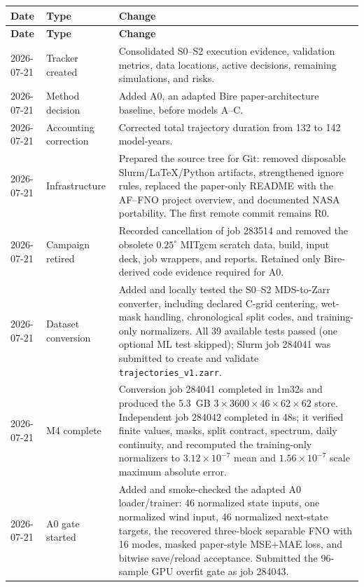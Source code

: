 \documentclass[11pt]{article}
\begin{document}
\begin{longtable}{@{}p{}p{}p{}@{}}
\toprule
\textbf{Date} & \textbf{Type} & \textbf{Change} \\
\midrule
\endfirsthead
\toprule
\textbf{Date} & \textbf{Type} & \textbf{Change} \\
\midrule
\endhead
2026-07-21 & Tracker created & Consolidated S0--S2 execution evidence, validation metrics, data locations, active decisions, remaining simulations, and risks. \\
2026-07-21 & Method decision & Added A0, an adapted Bire paper-architecture baseline, before models A--C. \\
2026-07-21 & Accounting correction & Corrected total trajectory duration from 132 to 142 model-years. \\
2026-07-21 & Infrastructure & Prepared the source tree for Git: removed disposable Slurm/LaTeX/Python artifacts, strengthened ignore rules, replaced the paper-only README with the AF--FNO project overview, and documented NASA portability.  The first remote commit remains R0. \\
2026-07-21 & Campaign retired & Recorded cancellation of job 283514 and removed the obsolete $0.25^\circ$ MITgcm scratch data, build, input deck, job wrappers, and reports.  Retained only Bire-derived code evidence required for A0. \\
2026-07-21 & Dataset conversion & Added and locally tested the S0--S2 MDS-to-Zarr converter, including declared C-grid centering, wet-mask handling, chronological split codes, and training-only normalizers.  All 39 available tests passed (one optional ML test skipped); Slurm job 284041 was submitted to create and validate \texttt{trajectories\_v1.zarr}. \\
2026-07-21 & M4 complete & Conversion job 284041 completed in 1m32s and produced the 5.3~GB $3\times3600\times46\times62\times62$ store.  Independent job 284042 completed in 48s; it verified finite values, masks, split contract, spectrum, daily continuity, and recomputed the training-only normalizers to $3.12\times10^{-7}$ mean and $1.56\times10^{-7}$ scale maximum absolute error. \\
2026-07-21 & A0 gate started & Added and smoke-checked the adapted A0 loader/trainer: 46 normalized state inputs, one normalized wind input, 46 normalized next-state targets, the recovered three-block separable FNO with 16 modes, masked paper-style MSE+MAE loss, and bitwise save/reload acceptance.  Submitted the 96-sample GPU overfit gate as job 284043. \\

\end{longtable}
\end{document}
